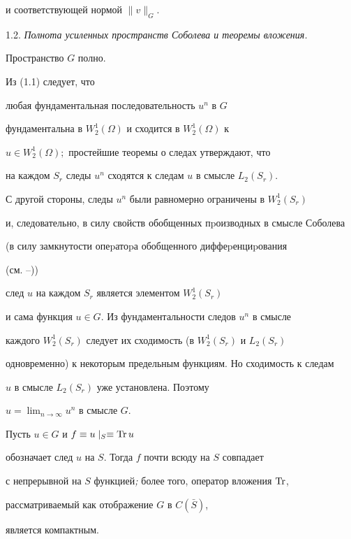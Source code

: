 и соответствующей нормой $\|v\|_G$.





1.2. {\it Полнота усиленных пространств Соболева и теоремы вложения.}





\begin{thmm}


Пространство $G$ полно.


\end{thmm}





\begin{pf} Из (1.1) следует, что


любая фундаментальная последовательность ${u^n}$ в $G$


фундаментальна в $W_2^1(\Omega)$ и сходится в $W_2^1(\Omega)$ к


$u\in W_2^1(\Omega);$ простейшие теоремы о следах утверждают, что


на каждом $S_r$ следы $u^n$ сходятся к следам $u$ в смысле $L_2(S_r).$


С другой стороны, следы $u^n$ были равномерно ограничены в $W_2^1(S_r)$


и, следовательно, в силу свойств обобщенных пpоизводных в смысле Соболева


(в силу замкнутости опеpатоpа обобщенного диффеpенциpования


(см. \cite{Bes}--\cite{Mi}))


след $u$ на каждом $S_r$ является элементом $W_2^1(S_r)$


и сама функция $u\in G.$ Из фундаментальности следов $u^n$ в смысле


каждого $W_2^1(S_r)$ следует их сходимость (в $W_2^1(S_r)$ и $L_2(S_r)$


одновременно) к некоторым предельным функци\-ям. Но сходимость к следам


$u$ в смысле $L_2(S_r)$ уже установлена. Поэтому


$u=\lim_{n\to\infty}u^n$ в смысле $G$.


\end{pf}





\begin{thmm} Пусть $u\in G$ и $f\equiv u\mid_S\equiv


\Tr u$


обозначает след $u$ на $S.$ Тогда $f$ почти всюду на $S$ совпадает


с непрерывной на $S$ функцией{\em ;} более того, оператор вложения $\operatorname{Tr}$,


рассматриваемый как отображение $G$ в $C(\bar S)$,


является компактным.


\end{thmm}





